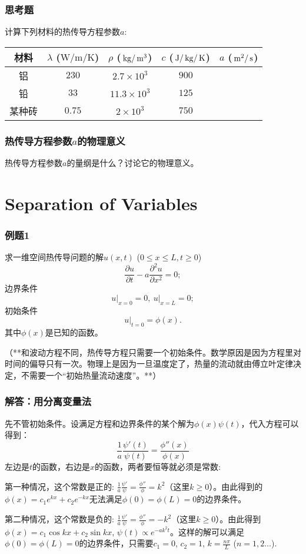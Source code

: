 \documentclass[CJK]{beamer}
\begin{document}
\begin{frame}
  \frametitle{思考题}
  计算下列材料的热传导方程参数$a$:

  \begin{tabular}{ccccc}
    \hline
    \hline
    材料 & $\lambda$ ($\mathrm{W/m/K}$) & $\rho$ ($\,\mathrm{kg}/\,\mathrm{m}^3$) & $c$ ($\,\mathrm{J}/\,\mathrm{kg}/\,\mathrm{K}$) & $a$ ($\,\mathrm{m}^2/\,\mathrm{s}$) \\
    \hline
    铝 & $230$ & $2.7\times 10^3$ & $900$ & \\
    铅 &  $33$ & $11.3\times 10^3$ & $125$ & \\
    某种砖 & $0.75$ & $2\times 10^3$ & $750$ & \\
    \hline
  \end{tabular}
\end{frame}


\begin{frame}
  \frametitle{热传导方程参数$a$的物理意义}

  
  热传导方程参数$a$的量纲是什么？讨论它的物理意义。
\end{frame}


\section{Separation of Variables}



\begin{frame}
  \frametitle{例题1}
  求一维空间热传导问题的解$u(x,t)$ ($0\le x\le L, t\ge 0$)
  $$ \frac{\partial u}{\partial t} - a\frac{\partial^2u}{\partial x^2} = 0;$$
  边界条件
  $$ \left.u\right\vert_{x=0} = 0,\ \left.u\right\vert_{x=L}=0; $$
  初始条件
  $$ \left.u\right\vert_{t=0} = \phi(x). $$
  其中$\phi(x)$是已知的函数。

  \skiplines
  {\scriptsize （**和波动方程不同，热传导方程只需要一个初始条件。数学原因是因为方程里对时间的偏导只有一次。物理上是因为一旦温度定了，热量的流动就由傅立叶定律决定，不需要一个“初始热量流动速度”。**）}
\end{frame}  


\begin{frame}
  \frametitle{解答：用分离变量法}
  先不管初始条件。设满足方程和边界条件的某个解为$\phi(x)\psi(t)$，代入方程可以得到：
  $$\frac{1}{a}\frac{\psi'(t)}{\psi(t)} = \frac{\phi''(x)}{\phi(x)} $$
  左边是$t$的函数，右边是$x$的函数，两者要恒等就必须是常数:
  \bitem
\item{第一种情况，这个常数是正的: $\frac{1}{a}\frac{\psi'}{\psi} = \frac{\phi''}{\phi} = k^2$（这里$k\ge 0$）。由此得到的$\phi(x) = c_1e^ {kx}+c_2e^{-kx}$无法满足$\phi(0)=\phi(L)=0$的边界条件。}
\item{第二种情况，这个常数是负的: $\frac{1}{a}\frac{\psi'}{\psi} = \frac{\phi''}{\phi} = -k^2$（这里$k\ge 0$）。由此得到$\phi(x) = c_1\cos{kx} + c_2\sin{kx}$, $\psi(t) \propto e^{-ak^2t}$。这样的解可以满足$\phi(0)=\phi(L)=0$的边界条件，只需要$c_1 = 0$, $c_2=1$, $k=\frac{n\pi}{L}$ ($n=1,2\ldots $).}
  \eitem
  
\end{frame}
\end{document}
